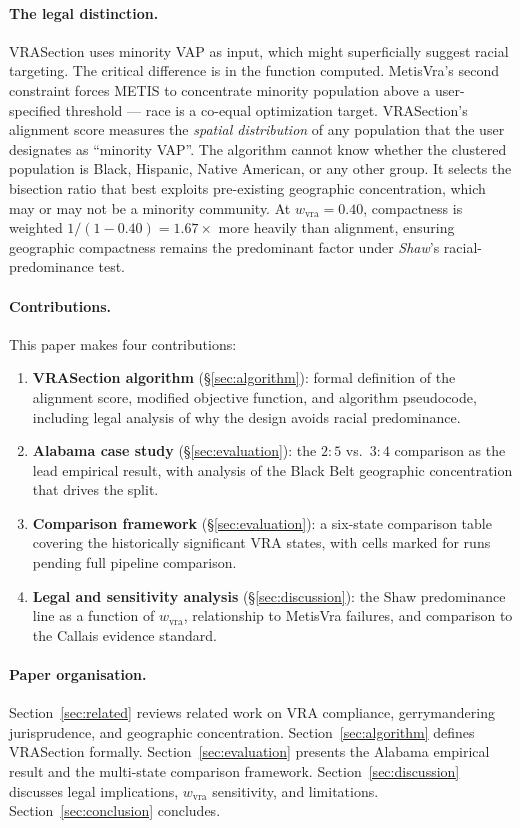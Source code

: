 \paragraph{The legal distinction.}
VRASection uses minority VAP as input, which might superficially suggest
racial targeting.
The critical difference is in the function computed.
MetisVra's second constraint forces METIS to concentrate minority
population above a user-specified threshold --- race is a co-equal
optimization target.
VRASection's alignment score measures the \emph{spatial distribution}
of any population that the user designates as ``minority VAP''.
The algorithm cannot know whether the clustered population is Black,
Hispanic, Native American, or any other group.
It selects the bisection ratio that best exploits pre-existing geographic
concentration, which may or may not be a minority community.
At $w_\text{vra} = 0.40$, compactness is weighted $1 / (1 - 0.40) = 1.67\times$
more heavily than alignment, ensuring geographic compactness remains the
predominant factor under \emph{Shaw}'s racial-predominance test.

\paragraph{Contributions.}
This paper makes four contributions:

\begin{enumerate}
\item \textbf{VRASection algorithm} (\S\ref{sec:algorithm}): formal
  definition of the alignment score, modified objective function, and
  algorithm pseudocode, including legal analysis of why the design
  avoids racial predominance.

\item \textbf{Alabama case study} (\S\ref{sec:evaluation}): the $2:5$
  vs.\ $3:4$ comparison as the lead empirical result, with analysis of
  the Black Belt geographic concentration that drives the split.

\item \textbf{Comparison framework} (\S\ref{sec:evaluation}): a six-state
  comparison table covering the historically significant VRA states,
  with cells marked for runs pending full pipeline comparison.

\item \textbf{Legal and sensitivity analysis} (\S\ref{sec:discussion}):
  the Shaw predominance line as a function of $w_\text{vra}$, relationship
  to MetisVra failures, and comparison to the Callais evidence standard.
\end{enumerate}

\paragraph{Paper organisation.}
Section~\ref{sec:related} reviews related work on VRA compliance,
gerrymandering jurisprudence, and geographic concentration.
Section~\ref{sec:algorithm} defines VRASection formally.
Section~\ref{sec:evaluation} presents the Alabama empirical result
and the multi-state comparison framework.
Section~\ref{sec:discussion} discusses legal implications, $w_\text{vra}$
sensitivity, and limitations.
Section~\ref{sec:conclusion} concludes.
